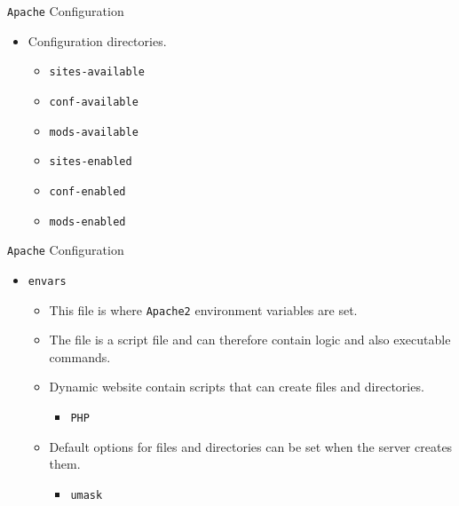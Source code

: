 \documentclass[xcolor=table,aspectratio=169]{beamer}
\begin{document}
\begin{frame}{\texttt{Apache} Configuration}
  \begin{itemize}
    \item Configuration directories.
      \begin{itemize}
        \item \texttt{sites-available}
        \item \texttt{conf-available}  
        \item \texttt{mods-available}  
        \item \texttt{sites-enabled}
        \item \texttt{conf-enabled}    
        \item \texttt{mods-enabled}
      \end{itemize}
  \end{itemize}
\end{frame}

\begin{frame}{\texttt{Apache} Configuration}
  \begin{itemize}
    \item \texttt{envars}
      \begin{itemize}
        \item This file is where \texttt{Apache2} environment variables are set.
        \item The file is a script file and can therefore contain logic and also executable commands.
        \item Dynamic website contain scripts that can create files and directories.
          \begin{itemize} 
            \item \texttt{PHP}
          \end{itemize}
        \item Default options for files and directories can be set when the server creates them.
          \begin{itemize} 
            \item \texttt{umask}
          \end{itemize}
      \end{itemize}
  \end{itemize}
\end{frame}
\end{document}
